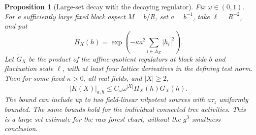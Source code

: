 \documentclass[11pt]{article}
\newtheorem{proposition}{Proposition}[section]
\begin{document}
\begin{proposition}[Large-set decay with the decaying regulator]\label{prop:forest_large}
Fix \(\omega\in(0,1)\). For a sufficiently large fixed block aspect
\(M=b/R\), set \(a=b^{-1}\), take \(\ell=R^{-2}\), and put
\[
 H_X(h)=\exp\left(-\kappa a^2\sum_{i\in\Lambda_X}|h_i|^2\right).
\]
Let \(\widetilde G_X\) be the product of the affine-quotient
regulators at block side \(b\) and fluctuation scale \(\ell\), with
at least four lattice derivatives in the defining test norm. Then
for some fixed \(\kappa>0\), all real fields, and \(|X|\ge2\),
\[
 |K(X)|_{a,h}\le C_\omega\omega^{|X|}H_X(h)\widetilde G_X(h).
\]
The bound can include up to two field-linear nilpotent sources with
\(a\tau_z\) uniformly bounded. The same bounds hold for the individual
connected tree activities. This is a large-set estimate for the
raw forest chart, without the \(g^3\) smallness conclusion.
\end{proposition}
\end{document}
